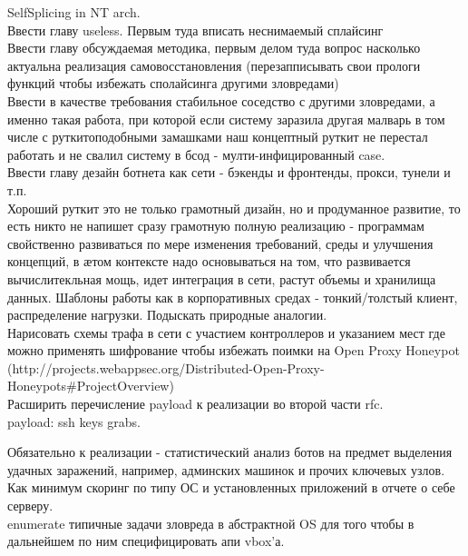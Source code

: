 SelfSplicing in NT arch.\\

Ввести главу useless. Первым туда вписать неснимаемый сплайсинг\\

Ввести главу обсуждаемая методика, первым делом туда вопрос насколько актуальна реализация самовосстановления (перезапписывать свои прологи функций чтобы избежать сполайсинга другими зловредами)\\

Ввести в качестве требования стабильное соседство с другими зловредами, а именно такая работа, при которой если систему заразила другая малварь в том числе с руткитоподобными замашками наш концептный руткит не перестал работать и не свалил систему в бсод - мулти-инфицированный case.\\
Ввести главу дезайн ботнета как сети - бэкенды и фронтенды, прокси, тунели и т.п.\\

Хороший руткит это не только грамотный дизайн, но и продуманное развитие, то есть никто не напишет сразу грамотную
полную реализацию - программам свойственно развиваться по мере изменения требований, среды и улучшения концепций,
в ӕтом контексте надо основываться на том, что развивается вычислитекльная мощь, идет интеграция в сети, растут объемы и хранилища данных. Шаблоны работы как в корпоративных средах - тонкий/толстый клиент, распределение нагрузки. Подыскать природные аналогии.\\

Нарисовать схемы трафа в сети с участием контроллеров и указанием мест где можно применять шифрование чтобы избежать поимки на Open Proxy Honeypot (http://projects.webappsec.org/Distributed-Open-Proxy-Honeypots#ProjectOverview)\\

Расширить перечисление payload к реализации во второй части rfc.\\

payload: ssh keys grabs.

Обязательно к реализации - статистический анализ ботов на предмет выделения удачных заражений, например, админских
машинок и прочих ключевых узлов. Как минимум скоринг по типу ОС и установленных приложений в отчете о себе серверу.\\

 enumerate типичные задачи зловреда в абстрактной OS для того чтобы в дальнейшем по ним специфицировать апи
 vbox'а.

